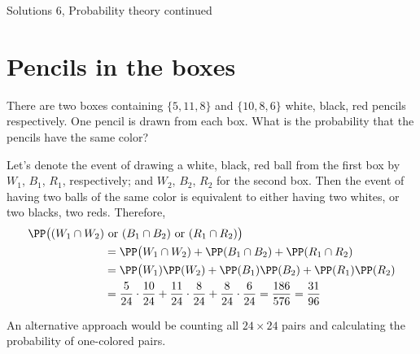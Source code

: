 \begin{center}\begin{large} Solutions 6, Probability theory continued
 \end{large}\end{center}
 \bigskip

\tableofcontents

\section{Pencils in the boxes}
\begin{problem} %
There are two boxes containing $\{5, 11, 8\}$ and $\{10, 8, 6\}$ white, black, red pencils respectively. One pencil is drawn from each box. What is the probability that the pencils have the same color?
\end{problem}
\bigskip

\begin{solution} %
Let's denote the event of drawing a white, black, red ball from the first box by $W_1$, $B_1$, $R_1$, respectively; and $W_2$, $B_2$, $R_2$ for the second box. Then the event of having two balls of the same color is equivalent to either having two whites, or two blacks, two reds. Therefore,
\begin{align*}
    \PP\big((W_1\cap W_2) &\text{ or } (B_1\cap B_2) \text{ or } (R_1\cap R_2) \big) \\&= \PP\big(W_1\cap W_2)+\PP(B_1\cap B_2) +\PP(R_1\cap R_2) \\&= \PP\big(W_1)\PP(W_2)+\PP(B_1)\PP(B_2) +\PP(R_1) \PP(R_2) \\&= \dfrac{5}{24}\cdot \dfrac{10}{24} +  \dfrac{11}{24}\cdot \dfrac{8}{24} +  \dfrac{8}{24}\cdot \dfrac{6}{24} = \dfrac{186}{576} = \dfrac{31}{96} 
\end{align*}

An alternative approach would be counting all $24\times 24$ pairs and calculating the probability of one-colored pairs.
\end{solution}

